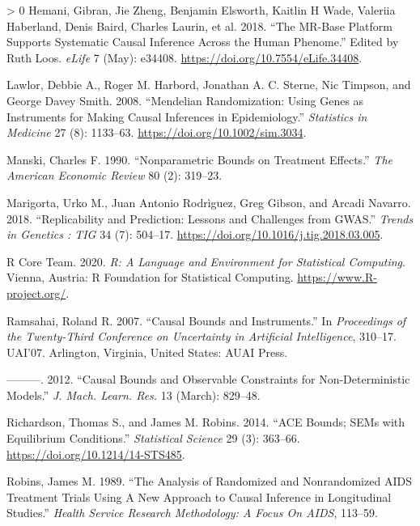 \documentclass[
]{article}
\theoremstyle{plain}
\newlength{\cslhangindent}
\newenvironment{CSLReferences}[3] %
 {%
  \setlength{\parindent}{0pt}
  \ifodd #1 \everypar{\setlength{\hangindent}{\cslhangindent}}\ignorespaces\fi
  \ifnum #2 > 0
  \setlength{\parskip}{#2\baselineskip}
  \fi
 }%
 {}
\begin{document}
\begin{CSLReferences}{1}{0}
\leavevmode\hypertarget{ref-mrbase}{}%
Hemani, Gibran, Jie Zheng, Benjamin Elsworth, Kaitlin H Wade, Valeriia Haberland, Denis Baird, Charles Laurin, et al. 2018. {``The MR-Base Platform Supports Systematic Causal Inference Across the Human Phenome.''} Edited by Ruth Loos. \emph{eLife} 7 (May): e34408. \url{https://doi.org/10.7554/eLife.34408}.

\leavevmode\hypertarget{ref-lawlor_mendelian_2008}{}%
Lawlor, Debbie A., Roger M. Harbord, Jonathan A. C. Sterne, Nic Timpson, and George Davey Smith. 2008. {``Mendelian Randomization: Using Genes as Instruments for Making Causal Inferences in Epidemiology.''} \emph{Statistics in Medicine} 27 (8): 1133--63. \url{https://doi.org/10.1002/sim.3034}.

\leavevmode\hypertarget{ref-manski_nonparametric_1990}{}%
Manski, Charles F. 1990. {``Nonparametric {Bounds} on {Treatment Effects}.''} \emph{The American Economic Review} 80 (2): 319--23.

\leavevmode\hypertarget{ref-marigorta_replicability_2018}{}%
Marigorta, Urko M., Juan Antonio Rodrìguez, Greg Gibson, and Arcadi Navarro. 2018. {``Replicability and {Prediction}: Lessons and Challenges from {GWAS}.''} \emph{Trends in Genetics : TIG} 34 (7): 504--17. \url{https://doi.org/10.1016/j.tig.2018.03.005}.

\leavevmode\hypertarget{ref-R}{}%
R Core Team. 2020. \emph{R: A Language and Environment for Statistical Computing}. Vienna, Austria: R Foundation for Statistical Computing. \url{https://www.R-project.org/}.

\leavevmode\hypertarget{ref-ramsahai_causal_2007}{}%
Ramsahai, Roland R. 2007. {``Causal {Bounds} and {Instruments}.''} In \emph{Proceedings of the {Twenty}-{Third Conference} on {Uncertainty} in {Artificial Intelligence}}, 310--17. {UAI}'07. {Arlington, Virginia, United States}: {AUAI Press}.

\leavevmode\hypertarget{ref-ramsahai_causal_2012}{}%
---------. 2012. {``Causal {Bounds} and {Observable Constraints} for {Non}-Deterministic {Models}.''} \emph{J. Mach. Learn. Res.} 13 (March): 829--48.

\leavevmode\hypertarget{ref-richardson_ace_2014}{}%
Richardson, Thomas S., and James M. Robins. 2014. {``{ACE Bounds}; {SEMs} with {Equilibrium Conditions}.''} \emph{Statistical Science} 29 (3): 363--66. \url{https://doi.org/10.1214/14-STS485}.

\leavevmode\hypertarget{ref-robins_analysis_1989}{}%
Robins, James M. 1989. {``The {Analysis} of {Randomized} and {Nonrandomized AIDS Treatment Trials Using A New Approach} to {Causal Inference} in {Longitudinal Studies}.''} \emph{Health Service Research Methodology: A Focus On AIDS}, 113--59.


\end{CSLReferences}
\end{document}

